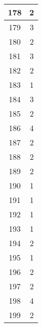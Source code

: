 \documentclass[letterpaper, 12pt]{article}
\begin{document}
\begin{longtable}{|c|c|}
\hline
178 & 2 \\
\hline
179 & 3 \\
\hline
180 & 2 \\
\hline
181 & 3 \\
\hline
182 & 2 \\
\hline
183 & 1 \\
\hline
184 & 3 \\
\hline
185 & 2 \\
\hline
186 & 4 \\
\hline
187 & 2 \\
\hline
188 & 2 \\
\hline
189 & 2 \\
\hline
190 & 1 \\
\hline
191 & 1 \\
\hline
192 & 1 \\
\hline
193 & 1 \\
\hline
194 & 2 \\
\hline
195 & 1 \\
\hline
196 & 2 \\
\hline
197 & 2 \\
\hline
198 & 4 \\
\hline
199 & 2 \\
\hline
\end{longtable}
\end{document}
